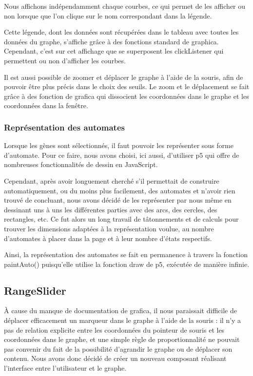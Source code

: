 Nous affichons indépendamment chaque courbes, ce qui permet de les afficher ou non lorsque que l’on clique sur le nom correspondant dans la légende.

Cette légende, dont les données sont récupérées dans le tableau avec toutes les données du graphe, s’affiche grâce à des fonctions standard de graphica. Cependant, c’est sur cet affichage que se superposent les clickListener qui permettent ou non d’afficher les courbes.

Il est aussi possible de zoomer et déplacer le graphe à l’aide de la souris, afin de pouvoir être plus précis dans le choix des seuils. Le zoom et le déplacement se fait grâce à des fonction de grafica qui dissocient les coordonnées dans le graphe et les coordonnées dans la fenêtre. 
\bigbreak
\subsubsection{Représentation des automates}
\bigbreak
Lorsque les gènes sont sélectionnés, il faut pouvoir les représenter sous forme d'automate. Pour ce faire, nous avons choisi, ici aussi, d'utiliser p5 qui offre de nombreuses fonctionnalités de dessin en JavaScript.

Cependant, après avoir longuement cherché s'il permettait de construire automatiquement, ou du moins plus facilement, des automates et n'avoir rien trouvé de concluant, nous avons décidé de les représenter par nous même en dessinant uns à uns les différentes parties avec des arcs, des cercles, des rectangles, etc. Ce fut alors un long travail de tâtonnements et de calculs pour trouver les dimensions adaptées à la représentation voulue, au nombre d'automates à placer dans la page et à leur nombre d'états respectifs.

Ainsi, la représentation des automates se fait en permanence à travers la fonction paintAuto() puisqu’elle utilise la fonction draw de p5, exécutée de manière infinie.
\bigbreak

\subsection{RangeSlider}

À cause du manque de documentation de grafica, il nous paraissait difficile de déplacer efficacement un marqueur dans le graphe à l’aide de la souris : il n’y a pas de relation explicite entre les coordonnées du pointeur de souris et les coordonnées dans le graphe, et une simple règle de proportionnalité ne pouvait pas convenir du fait de la possibilité d’agrandir le graphe ou de déplacer son contenu. Nous avons donc décidé de créer un nouveau composant réalisant l’interface entre l’utilisateur et le graphe.

